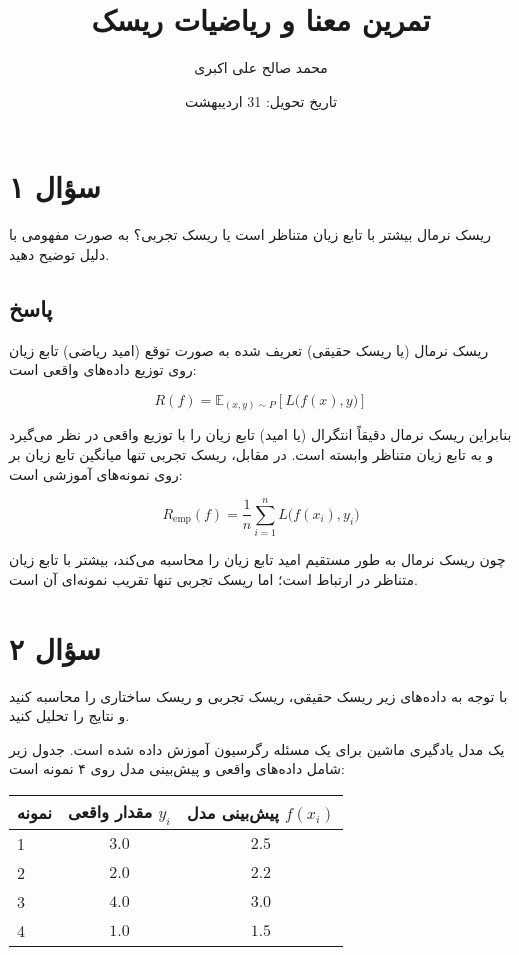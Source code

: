 \documentclass[12pt]{article}
\title{تمرین معنا و ریاضیات ریسک}
\author{محمد صالح علی اکبری}
\date{تاریخ تحویل: 31 اردیبهشت}
\begin{document}
	
	\maketitle
	
	\section*{سؤال ۱}
	ریسک نرمال بیشتر با تابع زیان متناظر است یا ریسک تجربی؟ به صورت مفهومی با دلیل توضیح دهید.
	
	\subsection*{پاسخ}
	ریسک نرمال (یا ریسک حقیقی) تعریف‌ شده به صورت توقع (امید ریاضی) تابع زیان روی توزیع داده‌های واقعی است:
	
	\[
	R( f ) = \mathbb{E}_{(x,y)\sim P}[L\bigl(f(x),y\bigr)]
	\]
	
	بنابراین ریسک نرمال دقیقاً انتگرال (یا امید) تابع زیان را با توزیع واقعی در نظر می‌گیرد و به تابع زیان متناظر وابسته است. در مقابل، ریسک تجربی تنها میانگین تابع زیان بر روی نمونه‌های آموزشی است:
	
	\[
	R_{\text{emp}}(f)=\frac{1}{n}\sum_{i=1}^{n}L\bigl(f(x_i),y_i\bigr)
	\]
	
	چون ریسک نرمال به طور مستقیم امید تابع زیان را محاسبه می‌کند، بیشتر با تابع زیان متناظر  در ارتباط است؛ اما ریسک تجربی تنها تقریب نمونه‌ای آن است.
	
	\section*{سؤال ۲}
	با توجه به داده‌های زیر ریسک حقیقی، ریسک تجربی و ریسک ساختاری را محاسبه کنید و نتایج را تحلیل کنید.
	
	یک مدل یادگیری ماشین برای یک مسئله رگرسیون آموزش داده شده است. جدول زیر شامل داده‌های واقعی و پیش‌بینی مدل روی ۴ نمونه است: \\
	
	\begin{table}[h!]
		\centering
		\begin{tabular}{lcc}
			\hline
			\textbf{نمونه} & \textbf{مقدار واقعی $y_i$} & \textbf{پیش‌بینی مدل $f(x_i)$} \\
			\hline
			1 & $3.0$ & $2.5$ \\
			2 & $2.0$ & $2.2$ \\
			3 & $4.0$ & $3.0$ \\
			4 & $1.0$ & $1.5$ \\
			\hline
		\end{tabular}
	\end{table}
	\\
	
\end{document}
